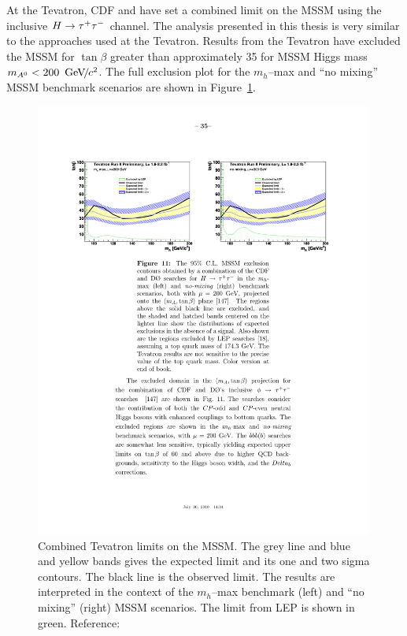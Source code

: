 At the Tevatron, CDF and \DZERO have set a combined limit on the MSSM using the
inclusive $H\to\tau^+\tau^-$ channel.  The analysis presented in this thesis is very  
similar to the approaches used at the Tevatron.  Results from the Tevatron have
excluded the MSSM for $\tan\beta$ greater than approximately 35 for MSSM Higgs
mass $m_{A^0} < 200~{\,\text{Ge\hspace{-.08em}V\hspace{-0.16em}/\hspace{-0.08em}}c^\text{2}}$.   The full
exclusion plot for the \mbox{$m_h$--max} and ``no mixing'' MSSM benchmark
scenarios are shown in Figure~\ref{fig:TevMSSMLimits}.
\begin{figure}
  \centering
  \includegraphics[width=0.99\textwidth]{theory_chapter/figures/tev_mssm_limits_mhmax_and_nomixing.pdf}
  \caption[Tevatron MSSM exclusion limits]{Combined Tevatron limits on the
  MSSM\@.  The grey line and blue and yellow bands gives the expected limit and
  its one and two sigma contours.  The black line is the observed limit.
  The results are interpreted in the context of the \mbox{$m_h$--max}
  benchmark (left) and ``no mixing'' (right) MSSM scenarios.  The limit from LEP
  is shown in green.
  Reference:~\cite{PDG}} \label{fig:TevMSSMLimits}
\end{figure}

